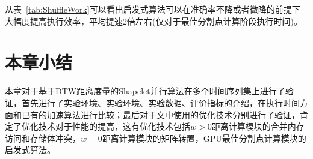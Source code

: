 从表~\ref{tab:ShuffleWork}可以看出启发式算法可以在准确率不降或者微降的前提下大幅度提高执行效率，平均提速2倍左右(仅对于最佳分割点计算阶段执行时间)。

\section{本章小结}

本章对于基于DTW距离度量的Shapelet并行算法在多个时间序列集上进行了验证，首先进行了实验环境、实验环境、实验数据、评价指标的介绍，在执行时间方面和已有的加速算法进行比较；最后对于文中使用的优化技术分别进行了验证，肯定了优化技术对于性能的提高，这有优化技术包括$w>0$距离计算模块的合并内存访问和存储体冲突，$w=0$距离计算模块的矩阵转置，GPU最佳分割点计算模块的启发式算法。
